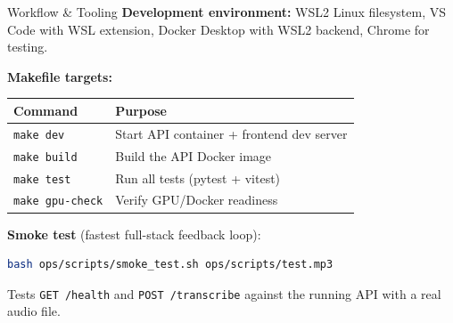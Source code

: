 \documentclass{beamer}
\begin{document}
\begin{frame}[fragile]{Workflow \& Tooling}
    \small
    \textbf{Development environment:}
    WSL2 Linux filesystem, VS Code with WSL extension,
    Docker Desktop with WSL2 backend, Chrome for testing.

    \vspace{0.3em}
    \textbf{Makefile targets:}
    \vspace{0.1em}

    \begin{table}
    \centering
    \small
    \begin{tabular}{ll}
        \toprule
        \textbf{Command} & \textbf{Purpose} \\
        \midrule
        \texttt{make dev}       & Start API container + frontend dev server \\
        \texttt{make build}     & Build the API Docker image \\
        \texttt{make test}      & Run all tests (pytest + vitest) \\
        \texttt{make gpu-check} & Verify GPU/Docker readiness \\
        \bottomrule
    \end{tabular}
    \end{table}

    \vspace{0.3em}
    \textbf{Smoke test} (fastest full-stack feedback loop):
    \begin{lstlisting}[language=bash]
bash ops/scripts/smoke_test.sh ops/scripts/test.mp3
    \end{lstlisting}
    Tests \texttt{GET /health} and \texttt{POST /transcribe} against the
    running API with a real audio file.
\end{frame}
\end{document}
